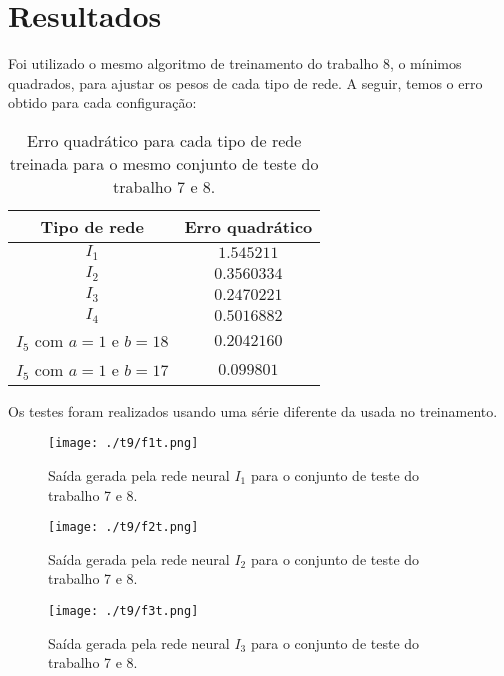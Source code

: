 \documentclass[10pt,journal,letterpaper,compsoc]{IEEEtran}
\begin{document}
\section{Resultados}

Foi utilizado o mesmo algoritmo de treinamento do trabalho 8, o mínimos quadrados, para ajustar
os pesos de cada tipo de rede. A seguir, temos o erro obtido para cada configuração:

\begin{table}[htb]
\caption{Erro quadrático para cada tipo de rede treinada para o mesmo conjunto de teste
do trabalho 7 e 8.}
\label{table.I}
\centering
\small

\begin{tabular}{c|c}

\hline
Tipo de rede & Erro quadrático\\
\hline
$I_1$ & $1.545211$\\
$I_2$ & $0.3560334$\\
$I_3$ & $0.2470221$\\
$I_4$ & $0.5016882$\\
$I_5$ com $a=1$ e $b=18$ & $0.2042160$\\
$I_5$ com $a=1$ e $b=17$ & $0.099801$ \\
\hline

\end{tabular}

\end{table}

Os testes foram realizados usando uma série diferente da usada no treinamento.


\begin{figure}[!htb]
     \centering
     \texttt{[image: ./t9/f1t.png]}
     \caption{Saída gerada pela rede neural $I_1$ para o conjunto de teste do trabalho 7 e 8.}
     \label{fig.teste.1}
\end{figure}



\begin{figure}[!htb]
     \centering
     \texttt{[image: ./t9/f2t.png]}
     \caption{Saída gerada pela rede neural $I_2$ para o conjunto de teste do trabalho 7 e 8.}
     \label{fig.teste.2}
\end{figure}



\begin{figure}[!htb]
     \centering
     \texttt{[image: ./t9/f3t.png]}
     \caption{Saída gerada pela rede neural $I_3$ para o conjunto de teste do trabalho 7 e 8.}
     \label{fig.teste.3}
\end{figure}
\end{document}
